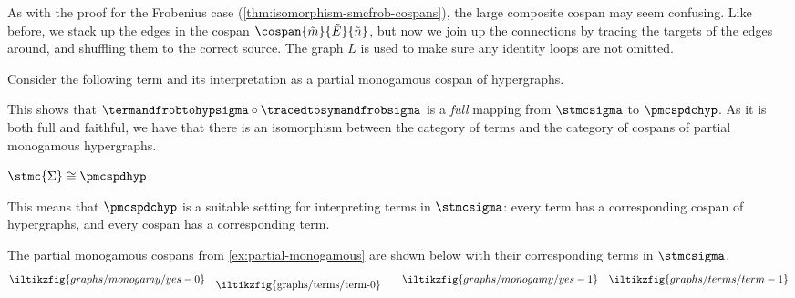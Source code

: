 As with the proof for the Frobenius case
(\cref{thm:isomorphism-smcfrob-cospans}), the large composite cospan may seem
confusing.
Like before, we stack up the edges in the cospan
\(\cospan{\tilde{m}}{\tilde{E}}{\tilde{n}}\), but now we join up the connections
by tracing the targets of the edges around, and shuffling them to the correct
source.
The graph \(L\) is used to make sure any identity loops are not omitted.

\begin{example}
    Consider the following term and its interpretation as a partial monogamous
    cospan of hypergraphs.
    \begin{center}
        \qquad
    \end{center}
\end{example}

This shows that \(
\termandfrobtohypsigma \circ \tracedtosymandfrobsigma
\) is a \emph{full} mapping from \(\stmcsigma\) to \(\pmcspdchyp\).
As it is both full and faithful, we have that there is an isomorphism
between the category of terms and the category of cospans of partial
monogamous hypergraphs.

\begin{corollary}\label{cor:stmc-graph-iso}
    \(\stmc{\Sigma} \cong \pmcspdhyp\).
\end{corollary}

This means that \(\pmcspdchyp\) is a suitable setting for interpreting terms in
\(\stmcsigma\): every term has a corresponding cospan of hypergraphs, and
every cospan has a corresponding term.

\begin{example}
    The partial monogamous cospans from \cref{ex:partial-monogamous} are shown
    below with their corresponding terms in \(\stmcsigma\).
    \[
        \iltikzfig{graphs/monogamy/yes-0}
        \quad
        \raisebox{-0.5em}{\iltikzfig{graphs/terms/term-0}}
        \qquad
        \iltikzfig{graphs/monogamy/yes-1}
        \quad
        \iltikzfig{graphs/terms/term-1}
    \]
\end{example}

